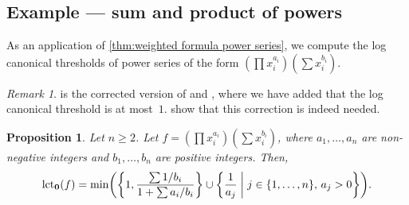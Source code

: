 \documentclass[a4paper, 12pt, oneside]{article}
\theoremstyle{plain}
\newtheorem{proposition}[theorem]{Proposition}
\theoremstyle{definition}
\theoremstyle{remark}
\newtheorem{remark}[theorem]{Remark}
\numberwithin{theorem}{section}
\numberwithin{table}{section}
\numberwithin{equation}{theorem}
\begin{document}
\subsection{Example --- sum and product of powers} \label{sec:examples}

As an application of \cref{thm:weighted formula power series}, we compute the log canonical thresholds of power series of the form $(\prod x_i^{a_i}) (\sum x_i^{b_i})$.

\begin{remark}
 is the corrected version of \cite[Example~8.17]{Kol97} and \cite[Proposition~2.2]{Kuw99}, where we have added that the log canonical threshold is at most~$1$.  show that this correction is indeed needed.
\end{remark}

\begin{proposition} \label{thm:examples power series}
Let $n \geq 2$. Let $f = (\prod x_i^{a_i}) (\sum x_i^{b_i})$, where $a_1, \ldots, a_n$ are non-negative integers and $b_1, \ldots, b_n$ are positive integers. Then,
\[
\operatorname{lct}_{\bm 0}(f) = \min\mleft(\mleft\{1, \frac{\sum 1/b_i}{1 + \sum a_i/b_i}\mright\} \cup \mleft\{ \frac{1}{a_j} \;\middle|\; j \in \{1, \ldots, n\},\, a_j > 0 \mright\}\mright).
\]
\end{proposition}
\end{document}
